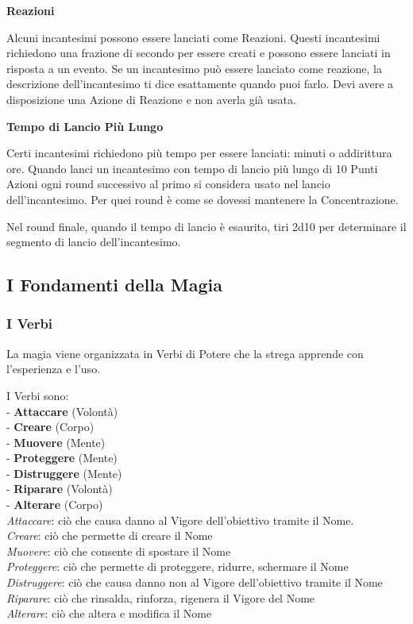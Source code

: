 \documentclass[12pt,a4paper,twoside,openany]{book}
\begin{document}
\begin{multicols}{2}
\textbf{Reazioni}

Alcuni incantesimi possono essere lanciati come Reazioni. Questi incantesimi richiedono una frazione di secondo per essere creati e possono essere lanciati in risposta a un evento. Se un incantesimo può essere lanciato come reazione, la descrizione dell'incantesimo ti dice esattamente quando puoi farlo. Devi avere a disposizione una Azione di Reazione e non averla già usata.

\textbf{Tempo di Lancio Più Lungo}

Certi incantesimi richiedono più tempo per essere lanciati: minuti o addirittura ore. Quando lanci un incantesimo con tempo di lancio più lungo di 10 Punti Azioni ogni round successivo al primo si considera usato nel lancio dell'incantesimo. Per quei round è come se dovessi mantenere la Concentrazione.

Nel round finale, quando il tempo di lancio è esaurito, tiri 2d10 per determinare il segmento di lancio dell'incantesimo.

\subsection{I Fondamenti della Magia}

\subsubsection{I Verbi}

La magia viene organizzata in Verbi di Potere che la strega apprende con l'esperienza e l'uso.

I Verbi sono:\\


- \textbf{Attaccare} (Volontà)\\
- \textbf{Creare} (Corpo)\\
- \textbf{Muovere} (Mente)\\
- \textbf{Proteggere} (Mente)\\
- \textbf{Distruggere} (Mente)\\
- \textbf{Riparare} (Volontà)\\
- \textbf{Alterare} (Corpo)\\

\textit{Attaccare}: ciò che causa danno al Vigore dell'obiettivo tramite il Nome.\\
\textit{Creare}: ciò che permette di creare il Nome\\
\textit{Muovere}: ciò che consente di spostare il Nome\\
\textit{Proteggere}: ciò che permette di proteggere, ridurre, schermare il Nome\\
\textit{Distruggere}: ciò che causa danno non al Vigore dell'obiettivo tramite il Nome\\
\textit{Riparare}: ciò che rinsalda, rinforza, rigenera il Vigore del Nome\\
\textit{Alterare}: ciò che altera e modifica il Nome


\end{multicols}
\end{document}
